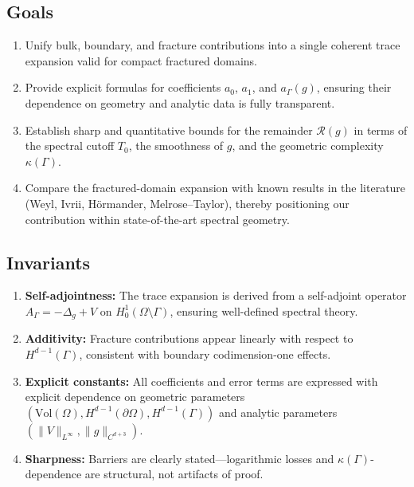 \subsection*{Goals}
\begin{enumerate}[label=G\arabic*]
  \item Unify bulk, boundary, and fracture contributions into a single coherent
  trace expansion valid for compact fractured domains.
  \item Provide explicit formulas for coefficients $a_0$, $a_1$, and
  $a_\Gamma(g)$, ensuring their dependence on geometry and analytic data is
  fully transparent.
  \item Establish sharp and quantitative bounds for the remainder
  $\mathcal{R}(g)$ in terms of the spectral cutoff $T_0$, the smoothness of
  $g$, and the geometric complexity $\kappa(\Gamma)$.
  \item Compare the fractured-domain expansion with known results in the
  literature (Weyl, Ivrii, Hörmander, Melrose--Taylor), thereby positioning our
  contribution within state-of-the-art spectral geometry.
\end{enumerate}

\subsection*{Invariants}
\begin{enumerate}[label=I\arabic*]
  \item \textbf{Self-adjointness:} The trace expansion is derived from a
  self-adjoint operator $A_\Gamma = -\Delta_g + V$ on
  $H^1_0(\Omega \setminus \Gamma)$, ensuring well-defined spectral theory.
  \item \textbf{Additivity:} Fracture contributions appear linearly with respect
  to $H^{d-1}(\Gamma)$, consistent with boundary codimension-one effects.
  \item \textbf{Explicit constants:} All coefficients and error terms are
  expressed with explicit dependence on geometric parameters
  $(\mathrm{Vol}(\Omega), H^{d-1}(\partial\Omega), H^{d-1}(\Gamma))$ and analytic
  parameters $(\|V\|_{L^\infty}, \|g\|_{C^{d+3}})$.
  \item \textbf{Sharpness:} Barriers are clearly stated—logarithmic losses and
  $\kappa(\Gamma)$-dependence are structural, not artifacts of proof.
\end{enumerate}

